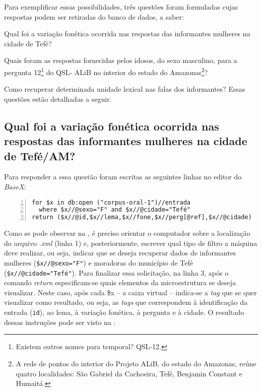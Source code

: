 \documentclass[portuguese]{textolivre}
\begin{document}
Para exemplificar essas possibilidades, três questões foram formuladas cujas respostas podem ser retiradas do banco de dados, a saber: 
\begin{enumerate*}[label=\roman*)]
\item Qual foi a variação fonética ocorrida nas respostas das informantes mulheres na cidade de Tefé? 
\item Quais foram as respostas fornecidas pelos idosos, do sexo masculino, para a pergunta 12\footnote{Existem outros nomes para temporal? QSL-12.} do QSL- ALiB no interior do estado do Amazonas\footnote{A rede de pontos do interior do Projeto ALiB, do estado do Amazonas, reúne quatro localidades: São Gabriel da Cachoeira, Tefé, Benjamin Constant e Humaitá.}? 
\item Como recuperar determinada unidade lexical nas falas dos informantes? Essas questões estão detalhadas a seguir.
\end{enumerate*}



\subsection{Qual foi a variação fonética ocorrida nas respostas das informantes mulheres na cidade de Tefé/AM?}
Para responder a essa questão foram escritas as seguintes linhas no editor do \emph{BaseX}:

\begin{lstlisting}[language=XQuery, label=tab04, caption={Instruções para a recuperação de dados referentes à variação fonética.}, source={Elaboração do autor.}, numbers=left]
for $x in db:open ("corpus-oral-1")//entrada
  where $x//@sexo="F" and $x//@cidade="Tefé" 
return ($x//@id,$x//lema,$x//fone,$x//perg[@ref],$x//@cidade)
\end{lstlisting} %

Como se pode observar na , é preciso orientar o computador sobre a localização do arquivo \emph{.xml} (linha 1) e, posteriormente, escrever qual tipo de filtro a máquina deve realizar, ou seja, indicar que se deseja recuperar dados de informantes mulheres (\lstinline[language=XML]!$x//@sexo="F"!) e moradoras do município de Tefé (\lstinline[language=XML]!$x//@cidade="Tefé"!). Para finalizar essa solicitação, na linha 3, após o comando \emph{return} especificam-se quais elementos da microestrutura se deseja visualizar. Neste caso, após cada \$x – a caixa virtual – indica-se a \emph{tag} que se quer visualizar como resultado, ou seja, as \emph{tags} que correspondem à identificação da entrada (\lstinline[language=XML]!id!), ao lema, à variação fonética, à pergunta e à cidade. O resultado dessas instruções pode ser visto na :
\end{document}
